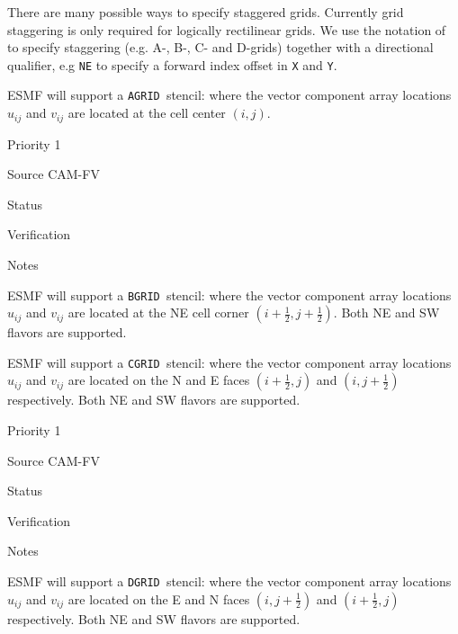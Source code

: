 There are many possible ways to specify staggered grids.  Currently
grid staggering is only required for logically rectilinear grids. We
use the notation of \cite{ref:a1966} to specify staggering (e.g. A-,
B-, C- and D-grids) together with a directional qualifier, e.g
\texttt{NE} to specify a forward index offset in \texttt{X} and
\texttt{Y}.

\newcommand{\agrid}{\texttt{AGRID~}}
\newcommand{\bgrid}{\texttt{BGRID~}}
\newcommand{\cgrid}{\texttt{CGRID~}}
\newcommand{\dgrid}{\texttt{DGRID~}}

\sreq{\agrid}

ESMF will support a \agrid stencil: where the vector
component array locations $u_{ij}$ and $v_{ij}$ are located at the
cell center $(i,j)$.

\begin{reqlist}
\item[Priority] 1
\item[Source] CAM-FV
\item[Status]
\item[Verification]
\item[Notes]
\end{reqlist}

\sreq{\bgrid}

ESMF will support a \bgrid stencil: where the vector component array
locations $u_{ij}$ and $v_{ij}$ are located at the NE cell corner
$(i+\frac12,j+\frac12)$. Both NE and SW flavors are supported.

\sreq{\cgrid}

ESMF will support a \cgrid stencil: where the vector component array
locations $u_{ij}$ and $v_{ij}$ are located on the N and E faces
$(i+\frac12,j)$ and $(i,j+\frac12)$ respectively. Both NE and SW
flavors are supported.

\begin{reqlist}
\item[Priority] 1
\item[Source] CAM-FV
\item[Status]
\item[Verification]
\item[Notes]
\end{reqlist}

\sreq{\dgrid}

ESMF will support a \dgrid stencil: where the vector component array
locations $u_{ij}$ and $v_{ij}$ are located on the E and N faces
$(i,j+\frac12)$ and $(i+\frac12,j)$ respectively. Both NE and SW
flavors are supported.

